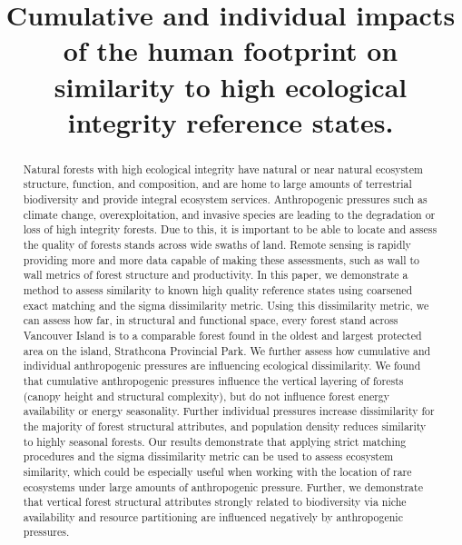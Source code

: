 \documentclass[
]{agujournal2019}
\begin{document}
\title{Cumulative and individual impacts of the human footprint on
similarity to high ecological integrity reference states.}



\begin{abstract}
Natural forests with high ecological integrity have natural or near
natural ecosystem structure, function, and composition, and are home to
large amounts of terrestrial biodiversity and provide integral ecosystem
services. Anthropogenic pressures such as climate change,
overexploitation, and invasive species are leading to the degradation or
loss of high integrity forests. Due to this, it is important to be able
to locate and assess the quality of forests stands across wide swaths of
land. Remote sensing is rapidly providing more and more data capable of
making these assessments, such as wall to wall metrics of forest
structure and productivity. In this paper, we demonstrate a method to
assess similarity to known high quality reference states using coarsened
exact matching and the sigma dissimilarity metric. Using this
dissimilarity metric, we can assess how far, in structural and
functional space, every forest stand across Vancouver Island is to a
comparable forest found in the oldest and largest protected area on the
island, Strathcona Provincial Park. We further assess how cumulative and
individual anthropogenic pressures are influencing ecological
dissimilarity. We found that cumulative anthropogenic pressures
influence the vertical layering of forests (canopy height and structural
complexity), but do not influence forest energy availability or energy
seasonality. Further individual pressures increase dissimilarity for the
majority of forest structural attributes, and population density reduces
similarity to highly seasonal forests. Our results demonstrate that
applying strict matching procedures and the sigma dissimilarity metric
can be used to assess ecosystem similarity, which could be especially
useful when working with the location of rare ecosystems under large
amounts of anthropogenic pressure. Further, we demonstrate that vertical
forest structural attributes strongly related to biodiversity via niche
availability and resource partitioning are influenced negatively by
anthropogenic pressures.
\end{abstract}
\end{document}
